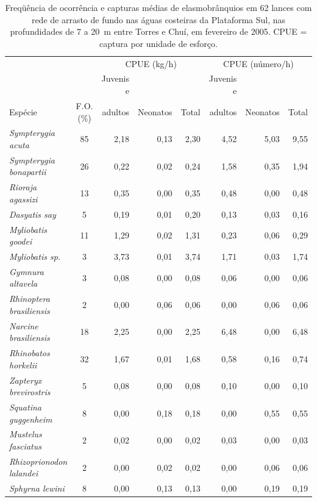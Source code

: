 \documentclass[a4paper,11pt,twoside,showtrims,onecolumn,openright,final]{memoir}
\begin{document}
\begin{table}
\caption[Freqüência de ocorrência e capturas médias de elasmobrânquios em lances com 
         arrasto de fundo nas águas costeiras da Plataforma Sul]
	{Freqüência de ocorrência e capturas médias de elasmobrânquios em 62 lances com 
         rede de arrasto de fundo nas águas costeiras da Plataforma Sul, nas profundidades de 7 a 20~m 
         entre Torres e Chuí, em fevereiro de 2005. CPUE = captura por unidade de esforço.}
\label{tab:elasmos-tab1}
\begin{footnotesize}
\begin{tabular*}{\textwidth}{l@{\extracolsep{\fill}}crrrrrr}
\toprule
				&		& \multicolumn{3}{c}{CPUE (kg/h)}		& \multicolumn{3}{c}{CPUE (número/h)}		\\
\cmidrule(r){3-5} \cmidrule(l){6-8}
				&		& Juvenis e	&		&		& Juvenis e	&		&		\\
Espécie				& F.O. (\%)	& adultos	& Neonatos	& Total		& adultos	& Neonatos	& Total		\\
\midrule
\emph{Sympterygia acuta}	& 85		& 2,18		& 0,13		& 2,30		& 4,52		& 5,03		& 9,55	\\
\emph{Sympterygia bonapartii}	& 26		& 0,22		& 0,02		& 0,24		& 1,58		& 0,35		& 1,94	\\
\emph{Rioraja agassizi}		& 13		& 0,35		& 0,00		& 0,35		& 0,48		& 0,00		& 0,48	\\
\emph{Dasyatis say}		& 5		& 0,19		& 0,01		& 0,20		& 0,13		& 0,03		& 0,16	\\
\emph{Myliobatis goodei}	& 11		& 1,29		& 0,02		& 1,31		& 0,23		& 0,06		& 0,29	\\
\emph{Myliobatis sp.}		& 3		& 3,73		& 0,01		& 3,74		& 1,71		& 0,03		& 1,74	\\
\emph{Gymnura altavela}		& 3		& 0,08		& 0,00		& 0,08		& 0,06		& 0,00		& 0,06	\\
\emph{Rhinoptera brasiliensis}	& 2		& 0,00		& 0,06		& 0,06		& 0,00		& 0,06		& 0,06	\\
\emph{Narcine brasiliensis}	& 18		& 2,25		& 0,00		& 2,25		& 6,48		& 0,00		& 6,48	\\
\emph{Rhinobatos horkelii}	& 32		& 1,67		& 0,01		& 1,68		& 0,58		& 0,16		& 0,74	\\
\emph{Zapteryx brevirostris}	& 5		& 0,08		& 0,00		& 0,08		& 0,10		& 0,00		& 0,10	\\
\emph{Squatina guggenheim}	& 8		& 0,00		& 0,18		& 0,18		& 0,00		& 0,55		& 0,55	\\
\emph{Mustelus fasciatus}	& 2		& 0,02		& 0,00		& 0,02		& 0,03		& 0,00		& 0,03	\\
\emph{Rhizoprionodon lalandei}	& 2		& 0,00		& 0,02		& 0,02		& 0,00		& 0,06		& 0,06	\\
\emph{Sphyrna lewini}		& 8		& 0,00		& 0,13		& 0,13		& 0,00		& 0,19		& 0,19	\\
\bottomrule
\end{tabular*}
\end{footnotesize}
\end{table}
\end{document}
